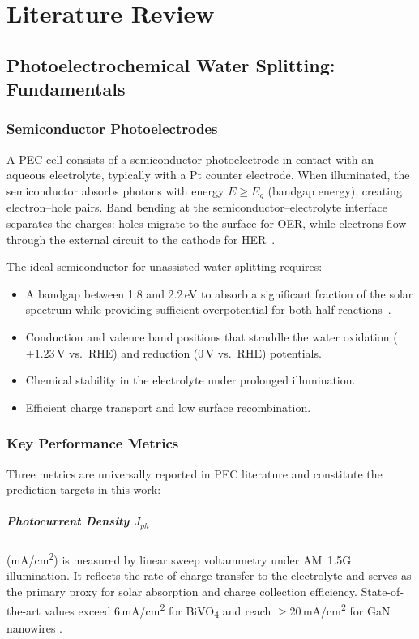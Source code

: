 \chapter{Literature Review}\label{ch:A}

\section{Photoelectrochemical Water Splitting: Fundamentals}

\subsection{Semiconductor Photoelectrodes}

A PEC cell consists of a semiconductor photoelectrode in contact with an aqueous
electrolyte, typically with a Pt counter electrode.
When illuminated, the semiconductor absorbs photons with energy $E \geq E_g$
(bandgap energy), creating electron--hole pairs.
Band bending at the semiconductor--electrolyte interface separates the charges:
holes migrate to the surface for OER, while electrons flow through the external
circuit to the cathode for HER~\cite{gratzel2001photoelectrochemical}.

The ideal semiconductor for unassisted water splitting requires:
\begin{itemize}
  \item A bandgap between 1.8 and 2.2\,eV to absorb a significant fraction of the
        solar spectrum while providing sufficient overpotential for both
        half-reactions~\cite{bolton1978limiting}.
  \item Conduction and valence band positions that straddle the water
        oxidation ($+1.23\,\text{V}$ vs.\ RHE) and reduction (0\,V vs.\ RHE)
        potentials.
  \item Chemical stability in the electrolyte under prolonged illumination.
  \item Efficient charge transport and low surface recombination.
\end{itemize}

\subsection{Key Performance Metrics}

Three metrics are universally reported in PEC literature and constitute the
prediction targets in this work:

\paragraph{Photocurrent Density $J_{ph}$} (mA/cm\textsuperscript{2}) is measured
by linear sweep voltammetry under AM~1.5G illumination.
It reflects the rate of charge transfer to the electrolyte and serves as the
primary proxy for solar absorption and charge collection efficiency.
State-of-the-art values exceed 6\,mA/cm\textsuperscript{2} for BiVO\textsubscript{4}
\cite{kim2014bismuth} and reach $>$20\,mA/cm\textsuperscript{2} for GaN nanowires
\cite{kibria2015multibandgap}.

